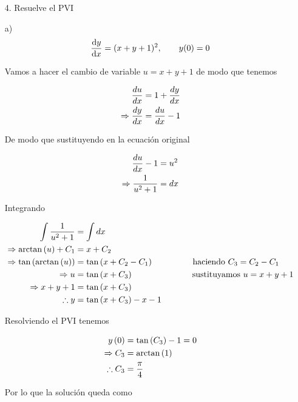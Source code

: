 \begin{enumerate}
    \item[4.] Resuelve el PVI
\end{enumerate}

\begin{enumerate}
\item[a)]
\begin{align*}
    \dv{y}{x} = (x+y+1)^{2}, \qquad y(0)=0
\end{align*}

Vamos a hacer el cambio de variable $u=x+y+1$ de modo que tenemos 

\begin{align*}
    \dfrac{du}{dx}&=1+\dfrac{dy}{dx}\\
    \Rightarrow \dfrac{dy}{dx}&=\dfrac{du}{dx}-1
\end{align*}

De modo que sustituyendo en la ecuación original

\begin{align*}
    \dfrac{du}{dx}-1&=u^2\\
    \Rightarrow \dfrac{1}{u^2+1}&=dx
\end{align*}

Integrando

\begin{align*}
    \int\dfrac{1}{u^2+1}&=\int dx\\
    \Rightarrow \arctan\left( u \right)+C_1&=x+C_2\\
    \Rightarrow \tan\left( \arctan\left( u \right) \right)&=\tan\left( x+C_2-C_1 \right)  ~~~~~~~~~~~~~~ \text{haciendo  } C_3=C_2-C_1 \\
    \Rightarrow u&=\tan\left( x+C_3 \right) ~~~~~~~~~~~~~~~~~~~~~ \text{sustituyamos $u=x+y+1$}\\
    \Rightarrow x+y+1&=\tan\left( x+C_3 \right)\\
    \therefore y&=\tan\left( x+C_3 \right)-x-1
\end{align*}

Resolviendo el PVI tenemos

\begin{align*}
    y\left( 0 \right)&=\tan\left( C_3 \right)-1=0\\
    \Rightarrow C_3&=\arctan\left( 1 \right)\\
    \therefore C_3&=\dfrac{\pi}{4}
\end{align*}

Por lo que la solución queda como

\begin{center}
\end{center}


\end{enumerate}
